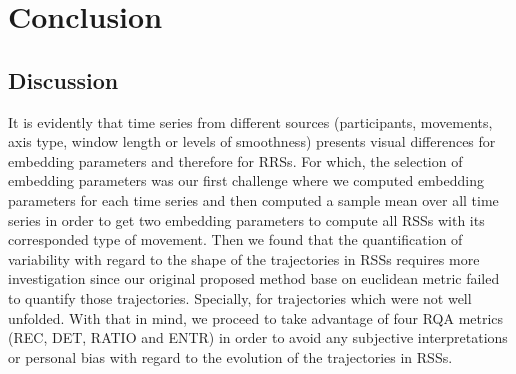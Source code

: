 
\chapter{Conclusion}

%




\section{Discussion}

It is evidently that time series from different sources (participants, movements, axis type, 
window length or levels of smoothness) presents visual differences for 
embedding parameters and therefore for RRSs. For which, the selection of embedding parameters 
was our first challenge where we computed embedding parameters for each time series and 
then computed a sample mean over all time series 
in order to get two embedding parameters to compute all RSSs with its corresponded type of movement.
Then we found that the quantification of variability with regard to the shape 
of the trajectories in RSSs requires more investigation since our original proposed method 
base on euclidean metric failed to quantify those trajectories. Specially, for trajectories 
which were not well unfolded. With that in mind, we proceed to take advantage of 
four RQA metrics (REC, DET, RATIO and ENTR) in order to avoid any subjective interpretations 
or personal bias with regard to the evolution of the trajectories in RSSs.


